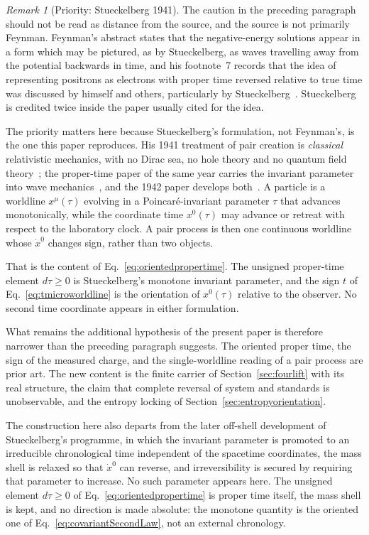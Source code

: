 \documentclass[11pt]{article}
\theoremstyle{definition}\newtheorem{definition}[theorem]{Definition}
\theoremstyle{remark}\newtheorem{remark}[theorem]{Remark}\newtheorem{conjecture}[theorem]{Conjecture}
\begin{document}
\begin{remark}[Priority: Stueckelberg 1941]\label{rem:stueckelbergpriority}
The caution in the preceding paragraph should not be read as distance from the source, and the source is not primarily Feynman. Feynman's abstract states that the negative-energy solutions appear in a form which may be pictured, as by Stueckelberg, as waves travelling away from the potential backwards in time, and his footnote~7 records that the idea of representing positrons as electrons with proper time reversed relative to true time was discussed by himself and others, particularly by Stueckelberg~\cite{Feynman1949}. Stueckelberg is credited twice inside the paper usually cited for the idea.

The priority matters here because Stueckelberg's formulation, not Feynman's, is the one this paper reproduces. His 1941 treatment of pair creation is \emph{classical} relativistic mechanics, with no Dirac sea, no hole theory and no quantum field theory~\cite{Stueckelberg1941a}; the proper-time paper of the same year carries the invariant parameter into wave mechanics~\cite{Stueckelberg1941b}, and the 1942 paper develops both~\cite{Stueckelberg1942}. A particle is a worldline $x^\mu(\tau)$ evolving in a Poincar\'e-invariant parameter $\tau$ that advances monotonically, while the coordinate time $x^0(\tau)$ may advance or retreat with respect to the laboratory clock. A pair process is then one continuous worldline whose $\dot x^0$ changes sign, rather than two objects.

That is the content of Eq.~\eqref{eq:orientedpropertime}. The unsigned proper-time element $d\tau\ge0$ is Stueckelberg's monotone invariant parameter, and the sign $t$ of Eq.~\eqref{eq:tmicroworldline} is the orientation of $x^0(\tau)$ relative to the observer. No second time coordinate appears in either formulation.

What remains the additional hypothesis of the present paper is therefore narrower than the preceding paragraph suggests. The oriented proper time, the sign of the measured charge, and the single-worldline reading of a pair process are prior art. The new content is the finite carrier of Section~\ref{sec:fourlift} with its real structure, the claim that complete reversal of system and standards is unobservable, and the entropy locking of Section~\ref{sec:entropyorientation}.

The construction here also departs from the later off-shell development of Stueckelberg's programme, in which the invariant parameter is promoted to an irreducible chronological time independent of the spacetime coordinates, the mass shell is relaxed so that $\dot x^0$ can reverse, and irreversibility is secured by requiring that parameter to increase. No such parameter appears here. The unsigned element $d\tau\ge0$ of Eq.~\eqref{eq:orientedpropertime} is proper time itself, the mass shell is kept, and no direction is made absolute: the monotone quantity is the oriented one of Eq.~\eqref{eq:covariantSecondLaw}, not an external chronology.
\end{remark}
\end{document}
